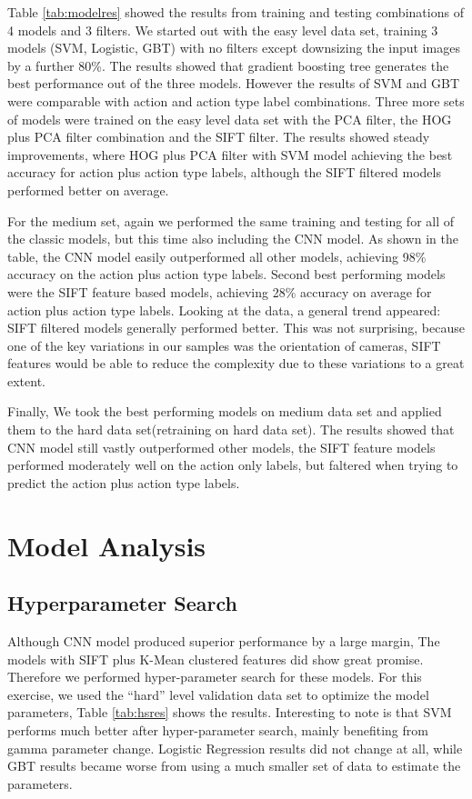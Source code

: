 \documentclass[
	a4paper, %
	10pt, %
	unnumberedsections, %
	twoside, %
]{t0004}
\begin{document}
Table \ref{tab:modelres} showed the results from training and testing combinations of 4 models and 3 filters. We started out with the easy level data set, training 3 models (SVM, Logistic, GBT) with no filters except downsizing the input images by a further 80\%. The results showed that gradient boosting tree generates the best performance out of the three models. However the results of SVM and GBT were comparable with action and action type label combinations. Three more sets of models were trained on the easy level data set with the PCA filter, the HOG plus PCA filter combination and the SIFT filter. The results showed steady improvements, where HOG plus PCA filter with SVM model achieving the best accuracy for action plus action type labels, although the SIFT filtered models performed better on average.

For the medium set, again we performed the same training and testing for all of the classic models, but this time also including the CNN model. As shown in the table, the CNN model easily outperformed all other models, achieving 98\% accuracy on the action plus action type labels. Second best performing models were the SIFT feature based models, achieving 28\% accuracy on average for action plus action type labels. Looking at the data, a general trend appeared: SIFT filtered models generally performed better. This was not surprising, because one of the key variations in our samples was the orientation of cameras, SIFT features would be able to reduce the complexity due to these variations to a great extent.

Finally, We took the best performing models on medium data set and applied them to the hard data set(retraining on hard data set). The results showed that CNN model still vastly outperformed other models, the SIFT feature models performed moderately well on the action only labels, but faltered when trying to predict the action plus action type labels.

\section{Model Analysis}

\subsection{Hyperparameter Search}

Although CNN model produced superior performance by a large margin, The models with SIFT plus K-Mean clustered features did show great promise. Therefore we performed hyper-parameter search for these models. For this exercise, we used the ``hard'' level validation data set to optimize the model parameters, Table \ref{tab:hsres} shows the results. Interesting to note is that SVM performs much better after hyper-parameter search, mainly benefiting from gamma parameter change. Logistic Regression results did not change at all, while GBT results became worse from using a much smaller set of data to estimate the parameters.
\end{document}
